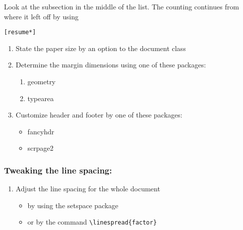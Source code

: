 \documentclass{article}
\begin{document}
\noindent
Look at the subsection in the middle of the list.
The counting continues from where it left off by using

\verb![resume*]!

\vspace{0.5in}

\begin{enumerate}
  \item State the paper size by an option to the document class
  \item Determine the margin dimensions using one of these packages:
  \begin{enumerate}
    \item geometry
    \item typearea
  \end{enumerate}
  \item Customize header and footer by one of these packages:
  \begin{itemize}
    \item fancyhdr
    \item scrpage2
  \end{itemize}
  \end{enumerate}
  \subsubsection*{Tweaking the line spacing:} %
  \begin{enumerate}[resume*]
  \item Adjust the line spacing for the whole document
  \begin{itemize}
    \item by using the setspace package
    \item or by the command \verb|\linespread{factor}|
  \end{itemize}
\end{enumerate}
\end{document}
